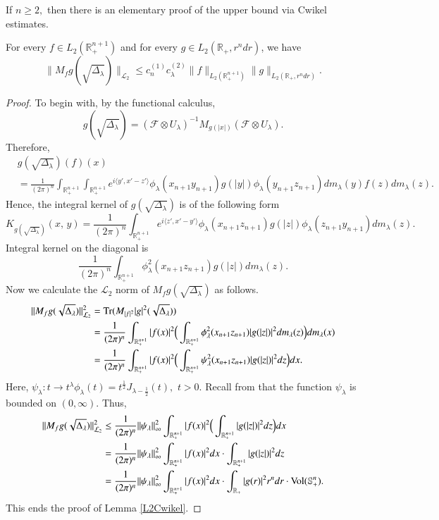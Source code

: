 \documentclass{amsart}
\begin{document}
If $n\geq2,$ then there is an elementary proof of the upper bound via Cwikel estimates.

\begin{lemma}\label{L2Cwikel}
For every $f\in L_2(\mathbb{R}_+^{n+1})$ and for every $g\in L_2(\mathbb{R}_+,r^ndr)$, we have
$$\|M_fg(\sqrt{\Delta_{\lambda}})\|_{\mathcal{L}_2}\leq c_n^{(1)}c_{\lambda}^{(2)}\|f\|_{L_2(\mathbb{R}_+^{n+1})}\|g\|_{L_2(\mathbb{R}_+,r^ndr)}.$$
\end{lemma}
\begin{proof} To begin with, by the functional calculus,
$$g(\sqrt{\Delta_{\lambda}})=(\mathcal{F}\otimes U_{\lambda})^{-1}M_{g(|x|)}(\mathcal{F}\otimes U_{\lambda}).$$
Therefore,
\begin{align*}
&g(\sqrt{\Delta_{\lambda}})(f)(x)\\
&=\frac{1}{(2\pi)^n}\int_{\mathbb{R}_+^{n+1}}\int_{\mathbb{R}_+^{n+1}}e^{i\langle y',x'-z'\rangle}\phi_\lambda(x_{n+1}y_{n+1})g(|y|)\phi_\lambda(y_{n+1}z_{n+1})dm_\lambda(y)f(z)dm_\lambda(z).
\end{align*}
Hence, the integral kernel of $g(\sqrt{\Delta_{\lambda}})$ is of the following form
$$K_{g(\sqrt{\Delta_{\lambda}})}(x,\,y)=\frac{1}{(2\pi)^n}\int_{\mathbb{R}_+^{n+1}}e^{i\langle z',x'-y'\rangle}\phi_\lambda(x_{n+1}z_{n+1})g(|z|)\phi_\lambda(z_{n+1}y_{n+1})dm_\lambda(z).$$
Integral kernel on the diagonal is
$$\frac{1}{(2\pi)^n}\int_{\mathbb{R}_+^{n+1}}\phi_\lambda^2(x_{n+1}z_{n+1})g(|z|)dm_\lambda(z).$$
Now we calculate the $\mathcal{L}_2$ norm of $M_fg(\sqrt{\Delta_{\lambda}})$ as follows.
\begin{align*}
\|M_fg(\sqrt{\Delta_{\lambda}})\|_{\mathcal{L}_2}^2&={\rm Tr}(M_{|f|^2}|g|^2(\sqrt{\Delta_{\lambda}}))\\
&=\frac{1}{(2\pi)^n}\int_{\mathbb{R}_+^{n+1}}|f(x)|^2\Big(\int_{\mathbb{R}_+^{n+1}}\phi_\lambda^2(x_{n+1}z_{n+1})|g(|z|)|^2dm_\lambda(z)\Big)dm_\lambda(x)\\
&=\frac{1}{(2\pi)^n}\int_{\mathbb{R}_+^{n+1}}|f(x)|^2\Big(\int_{\mathbb{R}_+^{n+1}}\psi_{\lambda}^2(x_{n+1}z_{n+1})|g(|z|)|^2dz\Big)dx.
\end{align*}
Here, $\psi_{\lambda}:t\to t^{\lambda}\phi_{\lambda}(t)=t^{\frac12}J_{\lambda-\frac12}(t),$ $t>0.$ Recall from \cite[p.364]{MR167642} that the function $\psi_{\lambda}$ is bounded on $(0,\infty).$ Thus,
\begin{align*}
\|M_fg(\sqrt{\Delta_{\lambda}})\|_{\mathcal{L}_2}^2
&\leq\frac{1}{(2\pi)^n}\|\psi_{\lambda}\|_{\infty}^2\int_{\mathbb{R}_+^{n+1}}|f(x)|^2\Big(\int_{\mathbb{R}_+^{n+1}}|g(|z|)|^2dz\Big)dx\\
&=\frac{1}{(2\pi)^n}\|\psi_{\lambda}\|_{\infty}^2\int_{\mathbb{R}_+^{n+1}}|f(x)|^2dx\cdot \int_{\mathbb{R}_+^{n+1}}|g(|z|)|^2dz\\
&=\frac{1}{(2\pi)^n}\|\psi_{\lambda}\|_{\infty}^2\int_{\mathbb{R}_+^{n+1}}|f(x)|^2dx\cdot \int_{\mathbb{R}_+}|g(r)|^2r^ndr\cdot {\rm Vol}(\mathbb{S}^n_+).
\end{align*}
This ends the proof of Lemma \ref{L2Cwikel}.
\end{proof}
\end{document}

